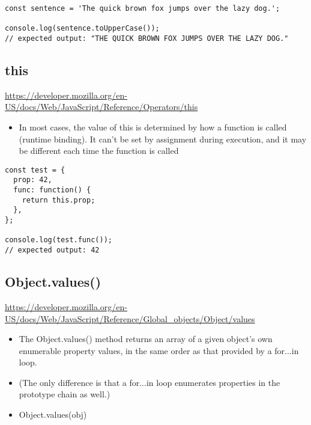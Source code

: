 \documentclass[10pt]{article}
\begin{document}
\begin{lstlisting}[title=Example toUpperCase(), captionpos=t]
const sentence = 'The quick brown fox jumps over the lazy dog.';

console.log(sentence.toUpperCase());
// expected output: "THE QUICK BROWN FOX JUMPS OVER THE LAZY DOG."
\end{lstlisting}


\medskip %







\medskip %
\pagebreak
\subsection{this}

\url{https://developer.mozilla.org/en-US/docs/Web/JavaScript/Reference/Operators/this}



\begin{itemize}
	\item In most cases, the value of this is determined by how a function is called (runtime binding). It can't be set by assignment during execution, and it may be different each time the function is called
\end{itemize}

\begin{lstlisting}[title=Example this, captionpos=t]
const test = {
  prop: 42,
  func: function() {
    return this.prop;
  },
};

console.log(test.func());
// expected output: 42
\end{lstlisting}
\medskip %









\medskip %
\pagebreak
\subsection{Object.values()}

\url{https://developer.mozilla.org/en-US/docs/Web/JavaScript/Reference/Global_objects/Object/values}


\begin{itemize}
	\item The Object.values() method returns an array of a given object's own enumerable property values, in the same order as that provided by a for...in loop.
	\item (The only difference is that a for...in loop enumerates properties in the prototype chain as well.)
	\item Object.values(obj)
\end{itemize}
\end{document}
